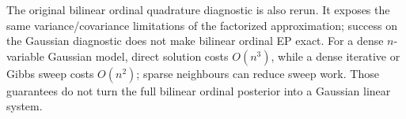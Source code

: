 \begin{table}[!htbp]\centering\small

\caption{Small Gaussian diagnostic. Gibbs values average five chains/seeds;
1,000 burn-in sweeps are excluded from the sample count but included in time.
MAP has no variance estimate, hence ``--''. Exact/iterative timings are single
small-system measurements. Full variation is in the CSV.}
\end{table}

The original bilinear ordinal quadrature diagnostic is also rerun. It exposes
the same variance/covariance limitations of the factorized approximation;
success on the Gaussian diagnostic does not make bilinear ordinal EP exact.
For a dense $n$-variable Gaussian model, direct solution costs $O(n^3)$,
while a dense iterative or Gibbs sweep costs $O(n^2)$; sparse neighbours
can reduce sweep work. Those guarantees do not turn the full bilinear ordinal
posterior into a Gaussian linear system.
